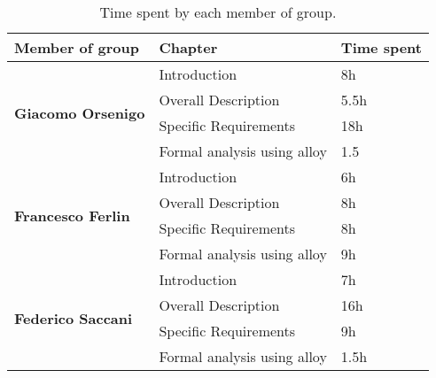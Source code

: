 \begin{table}[H]
      \centering
      \begin{tabular}{|l|l|l|}
            \hline
            \textbf{Member of group }                  & \textbf{Chapter}            & \textbf{Time spent} \\\hline
            \multirow{4}{*}{\textbf{Giacomo Orsenigo}} & Introduction                & 8h                  \\
                                                       & Overall Description         & 5.5h                \\
                                                       & Specific Requirements       & 18h                 \\
                                                       & Formal analysis using alloy & 1.5                 \\\hline
            \multirow{4}{*}{\textbf{Francesco Ferlin}} & Introduction                & 6h                  \\
                                                       & Overall Description         & 8h                  \\
                                                       & Specific Requirements       & 8h                  \\
                                                       & Formal analysis using alloy & 9h                  \\\hline
            \multirow{4}{*}{\textbf{Federico Saccani}} & Introduction                & 7h                  \\
                                                       & Overall Description         & 16h                 \\
                                                       & Specific Requirements       & 9h                  \\
                                                       & Formal analysis using alloy & 1.5h                \\\hline
      \end{tabular}
      \caption{Time spent by each member of group.}
      \label{table:Time spent}
\end{table}
